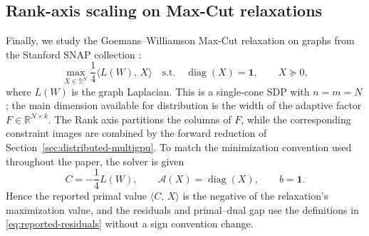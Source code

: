 \documentclass[11pt]{article}
\theoremstyle{definition}
\theoremstyle{remark}
\newcommand{\Sym}[1]{\mathbb{S}^{#1}}       %
\newcommand{\inner}[2]{\langle #1,\, #2\rangle}
\newcommand{\Aop}{\mathcal{A}}              %
\begin{document}
\subsection{Rank-axis scaling on Max-Cut relaxations}
\label{subsec:rankwise}

Finally, we study the Goemans--Williamson Max-Cut relaxation
\cite{GoemansWilliamson1995} on graphs from the Stanford SNAP collection
\cite{SNAPdatasets}:
\begin{equation}
  \max_{X\in\Sym{N}}
  \frac14\inner{L(W)}{X}
  \quad\text{s.t.}\quad
  \operatorname{diag}(X)=\mathbf 1,
  \qquad X\succeq0,
  \label{eq:maxcut-experiment-sdp}
\end{equation}
where $L(W)$ is the graph Laplacian.  This is a single-cone SDP with
$n=m=N$; the main dimension available for distribution is the width of the
adaptive factor $F\in\mathbb R^{N\times k}$.  The Rank axis partitions the
columns of $F$, while the corresponding constraint images are combined by the
forward reduction of Section~\ref{sec:distributed-multigpu}.
To match the minimization convention used throughout the paper, the solver is
given
\begin{equation}
  C=-\frac14L(W),
  \qquad \Aop(X)=\operatorname{diag}(X),
  \qquad b=\mathbf 1.
  \label{eq:maxcut-minimization-data}
\end{equation}
Hence the reported primal value $\inner{C}{X}$ is the negative of the
relaxation's maximization value, and the residuals and primal--dual gap use
the definitions in \eqref{eq:reported-residuals} without a sign convention
change.
\end{document}
